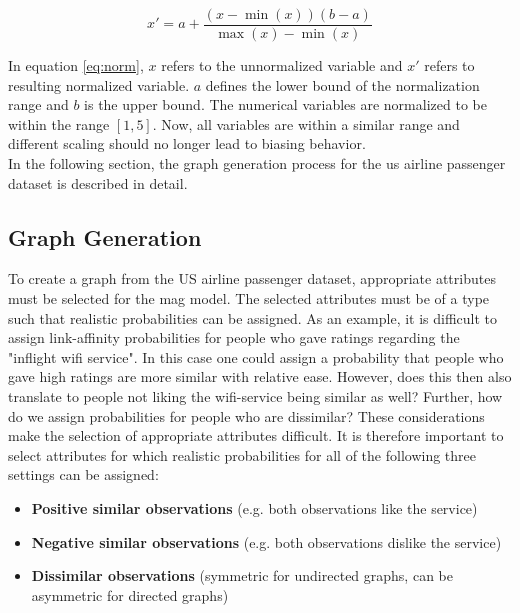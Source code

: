   \begin{equation}
    x' = a + \frac{(x - \min(x))(b - a)}{\max(x) - \min(x)}
    \label{eq:norm}
  \end{equation}

  \noindent In equation \ref{eq:norm}, $x$ refers to the unnormalized 
  variable and $x'$ refers to resulting normalized variable. $a$ defines 
  the lower bound of the normalization range and $b$ is the upper bound. The
  numerical variables are normalized to be within the range $[1,5]$. Now, all 
  variables are within a similar range and different scaling should no longer 
  lead to biasing behavior. \\

  \noindent In the following section, the graph generation process for the
  \acs{us} airline passenger dataset is described in detail.

  \subsection{Graph Generation}
  \label{section:graph_gen}

  To create a graph from the US airline passenger dataset, appropriate
  attributes must be selected for the \acs{mag} model. The selected attributes 
  must be of a type such that realistic probabilities can be assigned. As an 
  example, it is difficult to assign link-affinity probabilities for people who 
  gave ratings regarding the "inflight wifi service". In this case one could 
  assign a probability that people who gave high ratings are more similar with 
  relative ease. However, does this then also translate to people not liking 
  the wifi-service being similar as well? Further, how do we assign 
  probabilities for people who are dissimilar? These considerations make the 
  selection of appropriate attributes difficult. It is therefore important to 
  select attributes for which realistic probabilities for all of the following
  three settings can be assigned:

  \begin{itemize}
    \item \textbf{Positive similar observations} (e.g. both observations like 
      the service)
    \item \textbf{Negative similar observations} (e.g. both observations 
      dislike the service)
    \item \textbf{Dissimilar observations} (symmetric for undirected graphs, 
      can be asymmetric for directed graphs)
  \end{itemize}
 
